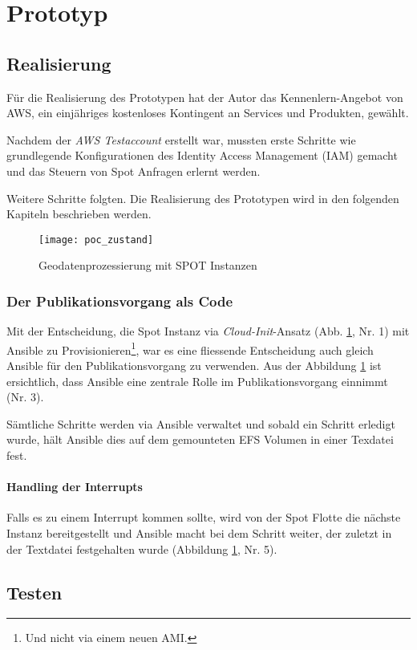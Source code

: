 \section{Prototyp}
\subsection{Realisierung}
Für die Realisierung des Prototypen hat der Autor das Kennenlern-Angebot von AWS, ein einjähriges kostenloses Kontingent an Services und Produkten\cite{FreeTier2020}, gewählt. 

Nachdem der \emph{AWS Testaccount} erstellt war, mussten erste Schritte wie grundlegende Konfigurationen des Identity Access Management (IAM) gemacht und das Steuern von Spot Anfragen erlernt werden.

Weitere Schritte folgten. Die Realisierung des Prototypen wird in den folgenden Kapiteln beschrieben werden.

\begin{figure}[H]
	\centering
	\texttt{[image: poc\_zustand]}
	\caption{Geodatenprozessierung mit SPOT Instanzen}
	\label{fig:ist_zustand}
\end{figure}

\subsubsection{Der Publikationsvorgang als Code}
Mit der Entscheidung, die Spot Instanz via \emph{Cloud-Init}-Ansatz (Abb. \ref{fig:ist_zustand}, Nr. 1) mit Ansible zu Provisionieren\footnote{Und nicht via einem neuen AMI.}, war es eine fliessende Entscheidung auch gleich Ansible für den Publikationsvorgang zu verwenden. Aus der Abbildung \ref{fig:ist_zustand} ist ersichtlich, dass Ansible eine zentrale Rolle im Publikationsvorgang einnimmt (Nr. 3). 

Sämtliche Schritte werden via Ansible verwaltet und sobald ein Schritt erledigt wurde, hält Ansible dies auf dem gemounteten EFS Volumen in einer Texdatei fest.

\paragraph{Handling der Interrupts}
Falls es zu einem Interrupt kommen sollte, wird von der Spot Flotte die nächste Instanz bereitgestellt und Ansible macht bei dem Schritt weiter, der zuletzt in der Textdatei festgehalten wurde (Abbildung \ref{fig:ist_zustand}, Nr. 5).


\subsection{Testen}

